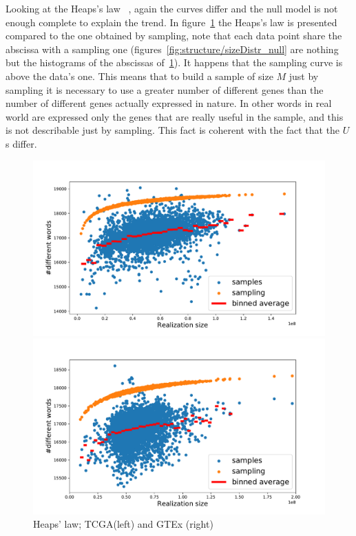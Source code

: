Looking at the Heaps's law~\cite{Heaps:1978:IRC:539986} 
, again the curves differ and the null model is not enough complete to explain the trend. In figure~\ref{fig:structure/heaps_null} the Heaps's law is presented compared to the one obtained by sampling, note that each data point share the abscissa with a sampling one (figures~\ref{fig:structure/sizeDistr_null} are nothing but the histograms of the abscissas of~\ref{fig:structure/heaps_null}). It happens that the sampling curve is above the data's one. This means that to build a sample of size $M$ just by sampling it is necessary to use a greater number of different genes than the number of different genes actually expressed in nature. In other words in real world are expressed only the genes that are really useful in the sample, and this is not describable just by sampling. This fact is coherent with the fact that the $U$s differ.
\begin{figure}[htb!]
\begin{minipage}{0.5\textwidth}
    \centering
    \includegraphics[width=0.95\linewidth]{pictures/structure/tcga/heaps_null.pdf}
    \end{minipage}
\hspace{2mm}
\begin{minipage}{0.5\textwidth}
    \centering
    \includegraphics[width=0.95\linewidth]{pictures/structure/gtex/heaps_null.pdf}
    \end{minipage}
\caption{Heaps' law; TCGA(left) and GTEx (right)}
\label{fig:structure/heaps_null}
\end{figure}
